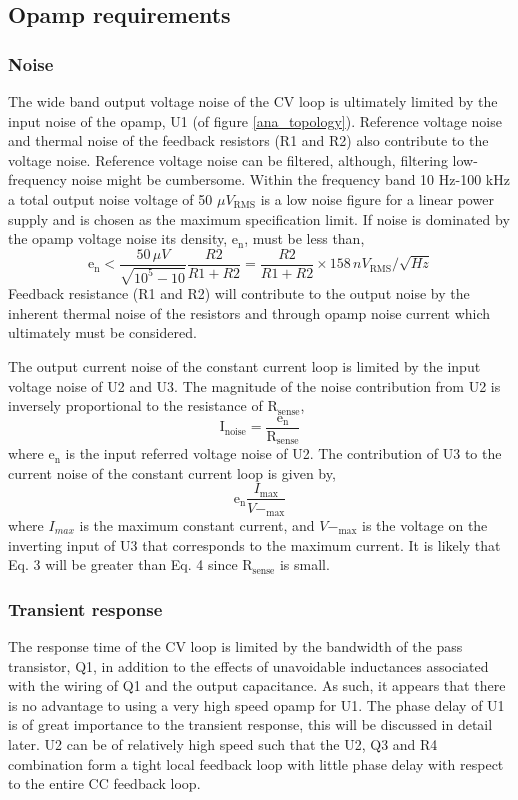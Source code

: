 \documentclass[a4paper,10pt, oneside]{article}
\begin{document}
\subsection*{Opamp requirements}
\subsubsection*{Noise}
The wide band output voltage noise of the CV loop is ultimately limited by the input noise of the opamp, U1 (of figure \ref{ana_topology}). Reference voltage noise and thermal noise of the feedback resistors (R1 and R2) also contribute to the voltage noise. Reference voltage noise can be filtered, although, filtering low-frequency noise might be cumbersome. Within the frequency band 10 Hz-100 kHz a total output noise voltage of 50 $\mu V_{\textrm{RMS}}$ is a low noise figure for a linear power supply and is chosen as the maximum specification limit. If noise is dominated by the opamp voltage noise its density, $\textrm{e}_{\textrm{n}}$, must be less than,
\begin{equation}
\textrm{e}_{\textrm{n}} < \frac{50\,\mu V}{\sqrt{10^{5}-10}}\frac{R2}{R1+R2} = \frac{R2}{R1+R2}\times 158\,nV_{\textrm{RMS}}/\sqrt{Hz}
\end{equation} 
Feedback resistance (R1 and R2) will contribute to the output noise by the inherent thermal noise of the resistors and through opamp noise current which ultimately must be considered. 

The output current noise of the constant current loop is limited by the input voltage noise of U2 and U3. The magnitude of the noise contribution from U2 is inversely proportional to the resistance of $\textrm{R}_{\textrm{sense}}$,
\begin{equation}
\textrm{I}_{\textrm{noise}} = \frac{\textrm{e}_{\textrm{n}}}{\textrm{R}_{\textrm{sense}}}
\end{equation}
where $\textrm{e}_{\textrm{n}}$ is the input referred voltage noise of U2. 
The contribution of U3 to the current noise of the constant current loop is given by,
\begin{equation}
\textrm{e}_{\textrm{n}}\frac{I_{\textrm{max}}}{V-_{\textrm{max}}}
\end{equation}
where $I_{max}$ is the maximum constant current, and $V-_{\textrm{max}}$ is the voltage on the inverting input of U3 that corresponds to the maximum current. It is likely that Eq. 3 will be greater than Eq. 4 since R$_{\textrm{sense}}$ is small. 
\subsubsection*{Transient response}
The response time of the CV loop is limited by the bandwidth of the pass transistor, Q1, in addition to the effects of unavoidable inductances associated with the wiring of Q1 and the output capacitance. As such, it appears that there is no advantage to using a very high speed opamp for U1. The phase delay of U1 is of great importance to the transient response, this will be discussed in detail later. 
U2 can be of relatively high speed such that the U2, Q3 and R4 combination form a tight local feedback loop with little phase delay with respect to the entire CC feedback loop.  
\end{document}
